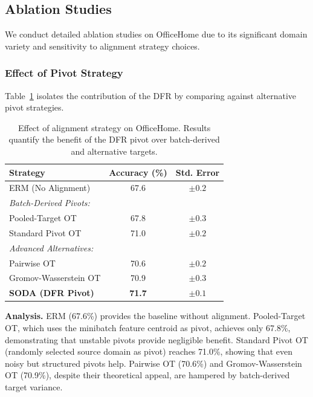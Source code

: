 \subsection{Ablation Studies}
\label{ssec:ablation}

We conduct detailed ablation studies on OfficeHome due to its significant domain variety and sensitivity to alignment strategy choices.

\subsubsection{Effect of Pivot Strategy}

Table~\ref{tab:ablation_pivot} isolates the contribution of the DFR by comparing against alternative pivot strategies.

\begin{table}[t]
\caption{Effect of alignment strategy on OfficeHome. Results quantify the benefit of the DFR pivot over batch-derived and alternative targets.}
\label{tab:ablation_pivot}
\centering
\small
\renewcommand{\arraystretch}{1.1}
\begin{tabular}{lcc}
\toprule
\textbf{Strategy} & \textbf{Accuracy (\%)} & \textbf{Std. Error} \\
\midrule
ERM (No Alignment) & 67.6 & $\pm 0.2$ \\
\midrule
\multicolumn{3}{l}{\textit{Batch-Derived Pivots:}} \\
\quad Pooled-Target OT & 67.8 & $\pm 0.3$ \\
\quad Standard Pivot OT & 71.0 & $\pm 0.2$ \\
\midrule
\multicolumn{3}{l}{\textit{Advanced Alternatives:}} \\
\quad Pairwise OT & 70.6 & $\pm 0.2$ \\
\quad Gromov-Wasserstein OT & 70.9 & $\pm 0.3$ \\
\midrule
\textbf{SODA (DFR Pivot)} & \textbf{71.7} & $\pm 0.1$ \\
\bottomrule
\end{tabular}
\end{table}

\textbf{Analysis.} ERM (67.6\%) provides the baseline without alignment. Pooled-Target OT, which uses the minibatch feature centroid as pivot, achieves only 67.8\%, demonstrating that unstable pivots provide negligible benefit. Standard Pivot OT (randomly selected source domain as pivot) reaches 71.0\%, showing that even noisy but structured pivots help. Pairwise OT (70.6\%) and Gromov-Wasserstein OT (70.9\%), despite their theoretical appeal, are hampered by batch-derived target variance.

